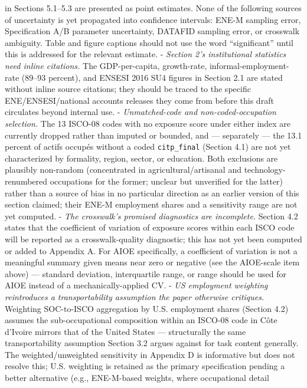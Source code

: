 \documentclass[
  11pt,
]{article}
\begin{document}
in Sections 5.1--5.3 are presented as point estimates. None of the
following sources of uncertainty is yet propagated into confidence
intervals: ENE-M sampling error, Specification A/B parameter
uncertainty, DATAFID sampling error, or crosswalk ambiguity. Table and
figure captions should not use the word ``significant'' until this is
addressed for the relevant estimate. - \emph{Section 2's institutional
statistics need inline citations.} The GDP-per-capita, growth-rate,
informal-employment-rate (89--93 percent), and ENSESI 2016 SU4 figures
in Section 2.1 are stated without inline source citations; they should
be traced to the specific ENE/ENSESI/national accounts releases they
come from before this draft circulates beyond internal use. -
\emph{Unmatched-code and non-coded-occupation selection.} The 13 ISCO-08
codes with no exposure score under either index are currently dropped
rather than imputed or bounded, and --- separately --- the 13.1 percent
of actifs occupés without a coded \texttt{citp\_final} (Section 4.1) are
not yet characterized by formality, region, sector, or education. Both
exclusions are plausibly non-random (concentrated in
agricultural/artisanal and technology-renumbered occupations for the
former; unclear but unverified for the latter) rather than a source of
bias in no particular direction as an earlier version of this section
claimed; their ENE-M employment shares and a sensitivity range are not
yet computed. - \emph{The crosswalk's promised diagnostics are
incomplete.} Section 4.2 states that the coefficient of variation of
exposure scores within each ISCO code will be reported as a
crosswalk-quality diagnostic; this has not yet been computed or added to
Appendix A. For AIOE specifically, a coefficient of variation is not a
meaningful summary given means near zero or negative (see the AIOE-scale
item above) --- standard deviation, interquartile range, or range should
be used for AIOE instead of a mechanically-applied CV. - \emph{US
employment weighting reintroduces a transportability assumption the
paper otherwise critiques.} Weighting SOC-to-ISCO aggregation by U.S.
employment shares (Section 4.2) assumes the sub-occupational composition
within an ISCO-08 code in Côte d'Ivoire mirrors that of the United
States --- structurally the same transportability assumption Section 3.2
argues against for task content generally. The weighted/unweighted
sensitivity in Appendix D is informative but does not resolve this; U.S.
weighting is retained as the primary specification pending a better
alternative (e.g., ENE-M-based weights, where occupational detail
\end{document}
